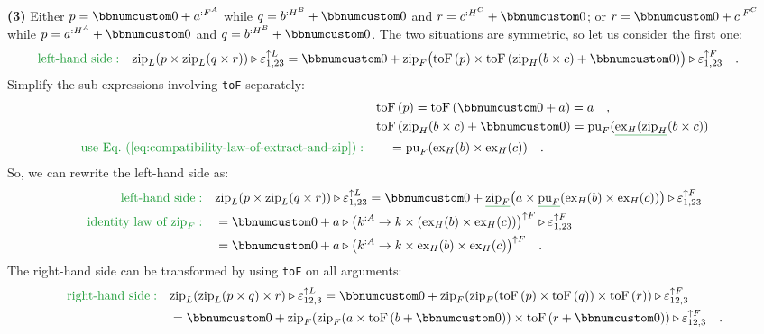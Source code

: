 \textbf{(3)} Either $p=\bbnum 0+a^{:F^{A}}$ while $q=b^{:H^{B}}+\bbnum 0$
and $r=c^{:H^{C}}+\bbnum 0$; or $r=\bbnum 0+c^{:F^{C}}$ while $p=a^{:H^{A}}+\bbnum 0$
and $q=b^{:H^{B}}+\bbnum 0$. The two situations are symmetric, so
let us consider the first one:
\begin{align*}
{\color{greenunder}\text{left-hand side}:}\quad & \text{zip}_{L}(p\times\text{zip}_{L}(q\times r))\triangleright\varepsilon_{1,23}^{\uparrow L}=\bbnum 0+\text{zip}_{F}\big(\text{toF}\,(p)\times\text{toF}\,(\text{zip}_{H}(b\times c)+\bbnum 0)\big)\triangleright\varepsilon_{1,23}^{\uparrow F}\quad.
\end{align*}
Simplify the sub-expressions involving \lstinline!toF! separately:
\begin{align*}
 & \text{toF}\,(p)=\text{toF}\,(\bbnum 0+a)=a\quad,\\
 & \text{toF}\,(\text{zip}_{H}(b\times c)+\bbnum 0)=\text{pu}_{F}(\gunderline{\text{ex}_{H}(\text{zip}_{H}}(b\times c))\\
{\color{greenunder}\text{use Eq.~(\ref{eq:compatibility-law-of-extract-and-zip})}:}\quad & \quad=\text{pu}_{F}(\text{ex}_{H}(b)\times\text{ex}_{H}(c))\quad.
\end{align*}
So, we can rewrite the left-hand side as:
\begin{align*}
{\color{greenunder}\text{left-hand side}:}\quad & \text{zip}_{L}(p\times\text{zip}_{L}(q\times r))\triangleright\varepsilon_{1,23}^{\uparrow L}=\bbnum 0+\gunderline{\text{zip}_{F}}\big(a\times\gunderline{\text{pu}_{F}}(\text{ex}_{H}(b)\times\text{ex}_{H}(c))\big)\triangleright\varepsilon_{1,23}^{\uparrow F}\\
{\color{greenunder}\text{identity law of }\text{zip}_{F}:}\quad & =\bbnum 0+a\triangleright\big(k^{:A}\rightarrow k\times(\text{ex}_{H}(b)\times\text{ex}_{H}(c))\big)^{\uparrow F}\triangleright\varepsilon_{1,23}^{\uparrow F}\\
 & =\bbnum 0+a\triangleright\big(k^{:A}\rightarrow k\times\text{ex}_{H}(b)\times\text{ex}_{H}(c)\big)^{\uparrow F}\quad.
\end{align*}
The right-hand side can be transformed by using \lstinline!toF! on
all arguments:
\begin{align*}
{\color{greenunder}\text{right-hand side}:}\quad & \text{zip}_{L}(\text{zip}_{L}(p\times q)\times r)\triangleright\varepsilon_{12,3}^{\uparrow L}=\bbnum 0+\text{zip}_{F}(\text{zip}_{F}(\text{toF}\left(p\right)\times\text{toF}\left(q\right))\times\text{toF}\left(r\right))\triangleright\varepsilon_{12,3}^{\uparrow F}\\
 & =\bbnum 0+\text{zip}_{F}(\text{zip}_{F}(a\times\text{toF}\left(b+\bbnum 0\right))\times\text{toF}\left(r+\bbnum 0\right))\triangleright\varepsilon_{12,3}^{\uparrow F}\quad.
\end{align*}
